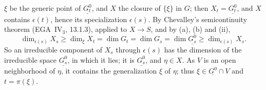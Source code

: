 \(\xi\) be the generic point of \(\underline{G_t^0}\), and \(X\) the closure of \(\{\xi\}\) in \(G\); then
\(X_t=\underline{G_t^0}\), and \(X\) contains \(\epsilon(t)\), hence its specialization \(\epsilon(s)\). By
Chevalley's semicontinuity theorem (EGA~IV\(_3\), 13.1.3), applied to \(X\to S\), and by \textup{(a)},
\textup{(b)} and \textup{(ii)},
\[
  \dim_{\epsilon(s)}X_s\geq\dim_\xi X_t=\dim G_t=\dim G_s=\dim\underline{G_s^0}
  \geq\dim_{\epsilon(s)}X_s.
\]
So an irreducible component of \(X_s\) through \(\epsilon(s)\) has the dimension of the irreducible space
\(\underline{G_s^0}\), in which it lies; it is \(\underline{G_s^0}\), and \(\eta\in X\). As \(V\) is an
open neighborhood of \(\eta\), it contains the generalization \(\xi\) of \(\eta\); thus
\(\xi\in\underline{G^0}\cap V\) and \(t=\pi(\xi)\).

